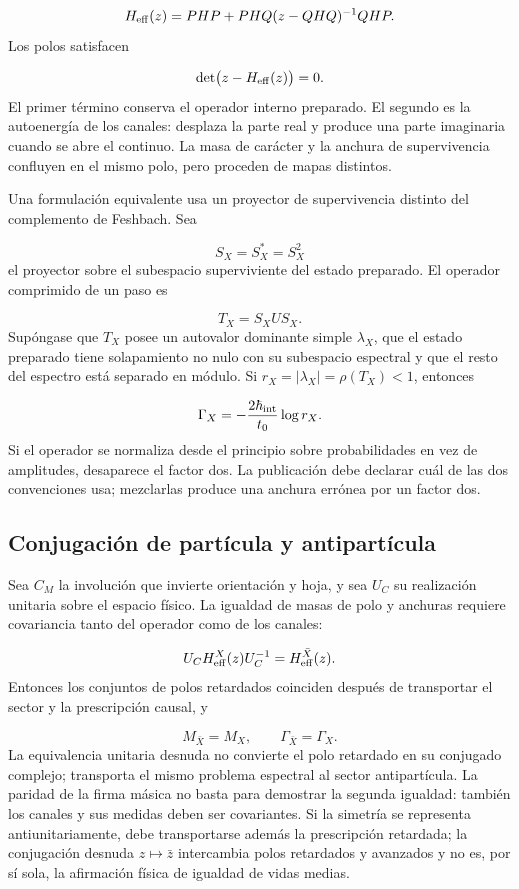 \[
H_{\rm eff}(z)
=PHP+PHQ(z-QHQ)^{-1}QHP.
\]
Los polos satisfacen

\[
\det\bigl(z-H_{\rm eff}(z)\bigr)=0.
\]
El primer término conserva el operador interno preparado. El segundo es la autoenergía de los canales: desplaza la parte real y produce una parte imaginaria cuando se abre el continuo. La masa de carácter y la anchura de supervivencia confluyen en el mismo polo, pero proceden de mapas distintos.

Una formulación equivalente usa un proyector de supervivencia distinto del complemento de Feshbach. Sea

\[
S_X=S_X^*=S_X^2
\]
el proyector sobre el subespacio superviviente del estado preparado. El operador comprimido de un paso es

\[
T_X=S_XUS_X.
\]
Supóngase que \(T_X\) posee un autovalor dominante simple \(\lambda_X\), que el estado preparado tiene solapamiento no nulo con su subespacio espectral y que el resto del espectro está separado en módulo. Si \(r_X=|\lambda_X|=\rho(T_X)<1\), entonces

\[
\Gamma_X=-\frac{2\hbar_{\rm int}}{t_0}\log r_X.
\]
Si el operador se normaliza desde el principio sobre probabilidades en vez de amplitudes, desaparece el factor dos. La publicación debe declarar cuál de las dos convenciones usa; mezclarlas produce una anchura errónea por un factor dos.

\subsection{Conjugación de partícula y antipartícula}
Sea \(C_M\) la involución que invierte orientación y hoja, y sea \(U_C\) su realización unitaria sobre el espacio físico. La igualdad de masas de polo y anchuras requiere covariancia tanto del operador como de los canales:

\[
U_CH_{\rm eff}^{X}(z)U_C^{-1}
=H_{\rm eff}^{\bar X}(z).
\]
Entonces los conjuntos de polos retardados coinciden después de transportar el sector y la prescripción causal, y

\[
M_{\bar X}=M_X,
\qquad
\Gamma_{\bar X}=\Gamma_X.
\]
La equivalencia unitaria desnuda no convierte el polo retardado en su conjugado complejo; transporta el mismo problema espectral al sector antipartícula. La paridad de la firma másica no basta para demostrar la segunda igualdad: también los canales y sus medidas deben ser covariantes. Si la simetría se representa antiunitariamente, debe transportarse además la prescripción retardada; la conjugación desnuda \(z\mapsto\bar z\) intercambia polos retardados y avanzados y no es, por sí sola, la afirmación física de igualdad de vidas medias.

